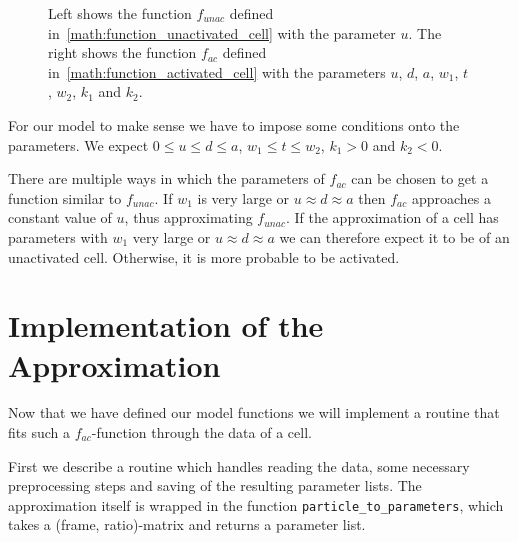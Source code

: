 \begin{figure}
\begin{subfigure}{0.45\linewidth}
	\end{subfigure}
	
	\caption{Left shows the function $f_{unac}$ defined in~\ref{math:function_unactivated_cell} with the parameter $u$. The right shows the function $f_{ac}$ defined in~\ref{math:function_activated_cell} with the parameters $u$, $d$, $a$, $w_1$, $t$, $w_2$, $k_1$ and $k_2$.}
	\label{fig:typical_time_series_with_parameters}
\end{figure}

For our model to make sense we have to impose some conditions onto the parameters. We expect $0 \leq u \leq d \leq a$, $w_1 \leq t \leq w_2$, $k_1 > 0$ and $k_2 < 0$.

There are multiple ways in which the parameters of $f_{ac}$ can be chosen to get a function similar to $f_{unac}$. If $w_1$ is very large or $u \approx d \approx a$ then $f_{ac}$ approaches a constant value of $u$, thus approximating $f_{unac}$. If the approximation of a cell has parameters with $w_1$ very large or $u \approx d \approx a$ we can therefore expect it to be of an unactivated cell. Otherwise, it is more probable to be activated.

\section{Implementation of the Approximation}

Now that we have defined our model functions we will implement a routine that fits such a $f_{ac}$-function through the data of a cell.

First we describe a routine which handles reading the data, some necessary preprocessing steps and saving of the resulting parameter lists. The approximation itself is wrapped in the function \texttt{particle\_to\_parameters}, which takes a (frame, ratio)-matrix and returns a parameter list.

